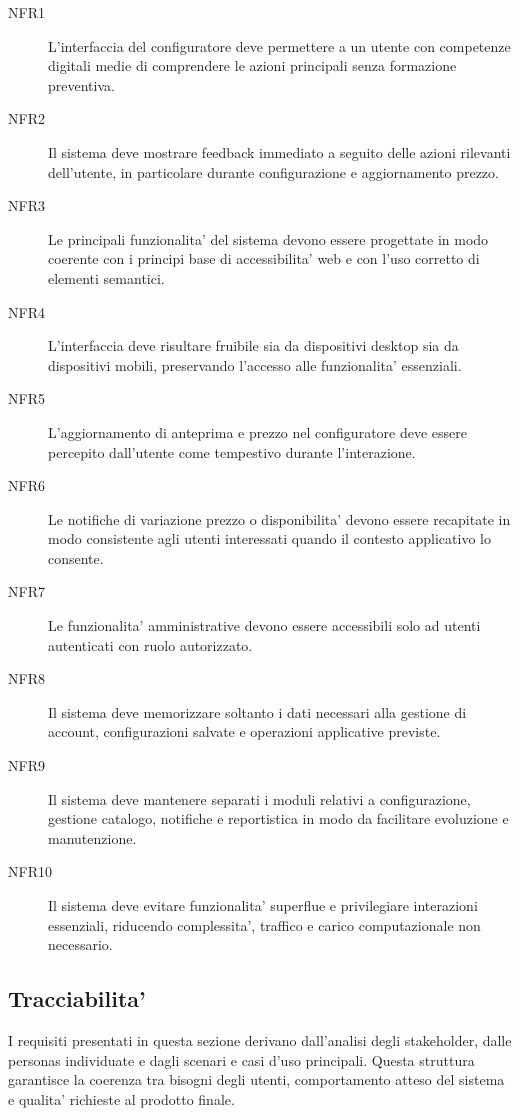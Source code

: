\begin{description}
	\item[NFR1] L'interfaccia del configuratore deve permettere a un utente con competenze digitali medie di comprendere le azioni principali senza formazione preventiva.
	\item[NFR2] Il sistema deve mostrare feedback immediato a seguito delle azioni rilevanti dell'utente, in particolare durante configurazione e aggiornamento prezzo.
	\item[NFR3] Le principali funzionalita' del sistema devono essere progettate in modo coerente con i principi base di accessibilita' web e con l'uso corretto di elementi semantici.
	\item[NFR4] L'interfaccia deve risultare fruibile sia da dispositivi desktop sia da dispositivi mobili, preservando l'accesso alle funzionalita' essenziali.
	\item[NFR5] L'aggiornamento di anteprima e prezzo nel configuratore deve essere percepito dall'utente come tempestivo durante l'interazione.
	\item[NFR6] Le notifiche di variazione prezzo o disponibilita' devono essere recapitate in modo consistente agli utenti interessati quando il contesto applicativo lo consente.
	\item[NFR7] Le funzionalita' amministrative devono essere accessibili solo ad utenti autenticati con ruolo autorizzato.
	\item[NFR8] Il sistema deve memorizzare soltanto i dati necessari alla gestione di account, configurazioni salvate e operazioni applicative previste.
	\item[NFR9] Il sistema deve mantenere separati i moduli relativi a configurazione, gestione catalogo, notifiche e reportistica in modo da facilitare evoluzione e manutenzione.
	\item[NFR10] Il sistema deve evitare funzionalita' superflue e privilegiare interazioni essenziali, riducendo complessita', traffico e carico computazionale non necessario.
\end{description}

\subsection{Tracciabilita'}

I requisiti presentati in questa sezione derivano dall'analisi degli stakeholder, dalle personas individuate e dagli scenari e casi d'uso principali.
Questa struttura garantisce la coerenza tra bisogni degli utenti, comportamento atteso del sistema e qualita' richieste al prodotto finale.

\newpage